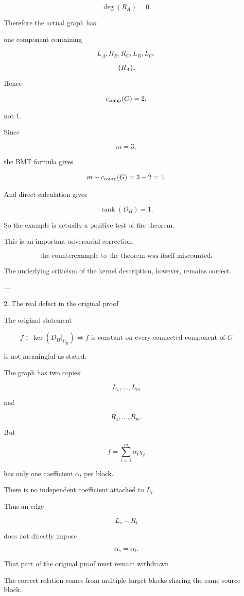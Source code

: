 \[
\deg(R_A)=0.
\]

Therefore the actual graph has:

one component containing


\[
  L_A,R_B,R_C,L_B,L_C,
\]

\[
  \{R_A\}.
\]

Hence

\[
c_{\rm comp}(G)=2,
\]

not \(1\).

Since

\[
m=3,
\]

the BMT formula gives

\[
m-c_{\rm comp}(G)=3-2=1.
\]

And direct calculation gives

\[
\operatorname{rank}(D_\Pi)=1.
\]

So the example is actually a positive test of the theorem.

This is an important adversarial correction:

\[
\boxed{\text{the counterexample to the theorem was itself miscounted.}}
\]

The underlying criticism of the kernel description, however, remains correct.


---

2. The real defect in the original proof

The original statement

\[
f\in\ker(D_\Pi|_{V_\Pi})
\iff
f\text{ is constant on every connected component of }G
\]

is not meaningful as stated.

The graph has two copies:

\[
L_1,\ldots,L_m
\]

and

\[
R_1,\ldots,R_m.
\]

But

\[
f=\sum_{t=1}^m\alpha_t\chi_t
\]

has only one coefficient \(\alpha_t\) per block.

There is no independent coefficient attached to \(L_t\).

Thus an edge

\[
L_s-R_t
\]

does not directly impose

\[
\alpha_s=\alpha_t.
\]

That part of the original proof must remain withdrawn.

The correct relation comes from multiple target blocks sharing the same source block.


